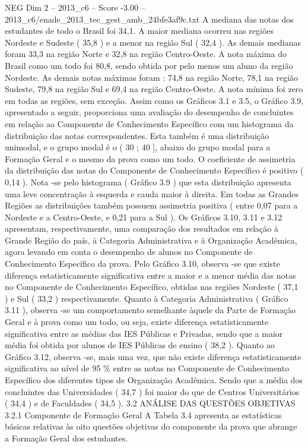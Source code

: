 \begin{textsample}{NEG Dim 2 – 2013\_c6 – Score -3.00 – 2013\_c6/enade\_2013\_tec\_gest\_amb\_24bfe3af9c.txt}
A mediana das notas dos estudantes de todo o Brasil foi 34,1.
A maior mediana ocorreu nas regiões Nordeste e Sudeste ( 35,8 ) e a menor na região Sul ( 32,4 ).
As demais medianas foram 33,3 na região Norte e 32,8 na região Centro-Oeste.
A nota máxima do Brasil como um todo foi 80,8, sendo obtida por pelo menos um aluno da região Nordeste.
As demais notas máximas foram : 74,8 na região Norte, 78,1 na região Sudeste, 79,8 na região Sul e 69,4 na região Centro-Oeste.
A nota mínima foi zero em todas as regiões, sem exceção.
Assim como os Gráficos 3.1 e 3.5, o Gráfico 3.9, apresentado a seguir, proporciona uma avaliação do desempenho de concluintes em relação ao Componente de Conhecimento Específico com um histograma da distribuição das notas correspondentes.
Esta também é uma distribuição unimodal, e o grupo modal é o ( 30 ; 40 ], abaixo do grupo modal para a Formação Geral e o mesmo da prova como um todo.
O coeficiente de assimetria da distribuição das notas do Componente de Conhecimento Específico é positivo ( 0,14 ).
Nota -se pelo histograma ( Gráfico 3.9 ) que esta distribuição apresenta uma leve concentração à esquerda e cauda maior à direita.
Em todas as Grandes Regiões as distribuições também possuem assimetria positiva ( entre 0,07 para a Nordeste e a Centro-Oeste, e 0,21 para a Sul ).
Os Gráficos 3.10, 3.11 e 3.12 apresentam, respectivamente, uma comparação dos resultados em relação à Grande Região do país, à Categoria Administrativa e à Organização Acadêmica, agora levando em conta o desempenho de alunos no Componente de Conhecimento Específico da prova.
Pelo Gráfico 3.10, observa -se que existe diferença estatisticamente significativa entre a maior e a menor média das notas no Componente de Conhecimento Específico, obtidas nas regiões Nordeste ( 37,1 ) e Sul ( 33,2 ) respectivamente.
Quanto à Categoria Administrativa ( Gráfico 3.11 ), observa -se um comportamento semelhante àquele da Parte de Formação Geral e à prova como um todo, ou seja, existe diferença estatisticamente significativa entre as médias das IES Públicas e Privadas, sendo que a maior média foi obtida por alunos de IES Públicas de ensino ( 38,2 ).
Quanto ao Gráfico 3.12, observa -se, mais uma vez, que não existe diferença estatisticamente significativa ao nível de 95 \% entre as notas no Componente de Conhecimento Específico dos diferentes tipos de Organização Acadêmica.
Sendo que a média dos concluintes das Universidades ( 34,7 ) foi maior do que de Centros Universitários ( 34,4 ) e de Faculdades ( 34,5 ). 3.2 ANÁLISE DAS QUESTÕES OBJETIVAS 3.2.1 Componente de Formação Geral A Tabela 3.4 apresenta as estatísticas básicas relativas às oito questões objetivas do componente da prova que abrange a Formação Geral dos estudantes.

\end{textsample}
